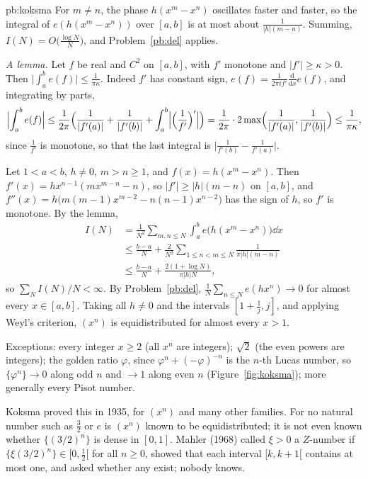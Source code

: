 \begin{solution}{pb:koksma}
\idea For $m\ne n$, the phase $h(x^m-x^n)$ oscillates faster and faster, so the integral of $e(h(x^m-x^n))$ over $[a,b]$ is at most about $\frac1{|h|(m-n)}$.
Summing, $I(N)=O\bigl(\frac{\log N}N\bigr)$, and Problem~\ref{pb:del} applies.

\writeup \emph{A lemma.} Let $f$ be real and $C^2$ on $[a,b]$, with $f'$ monotone and $|f'|\ge\kappa>0$. Then $\bigl|\int_a^be(f)\bigr|\le\frac1{\pi\kappa}$. Indeed $f'$ has
constant sign, $e(f)=\frac1{2\pi if'}\frac{\mathrm d}{\mathrm dx}e(f)$, and integrating by parts,
\[
\Bigl|\int_a^be(f)\Bigr|\le\frac1{2\pi}\Bigl(\frac1{|f'(a)|}+\frac1{|f'(b)|}+\int_a^b\Bigl|\Bigl(\frac1{f'}\Bigr)'\Bigr|\Bigr)=\frac1{2\pi}\cdot2\max\Bigl(\frac1{|f'(a)|},\frac1{|f'(b)|}\Bigr)\le\frac1{\pi\kappa},
\]
since $\frac1{f'}$ is monotone, so that the last integral is $\bigl|\frac1{f'(b)}-\frac1{f'(a)}\bigr|$.

Let $1<a<b$, $h\ne0$, $m>n\ge1$, and $f(x)=h(x^m-x^n)$. Then $f'(x)=hx^{n-1}(mx^{m-n}-n)$, so $|f'|\ge|h|(m-n)$ on $[a,b]$, and
$f''(x)=h\bigl(m(m-1)x^{m-2}-n(n-1)x^{n-2}\bigr)$ has the sign of $h$, so $f'$ is monotone. By the lemma,
\[
\begin{aligned}
I(N)&=\frac1{N^2}\sum_{m,n\le N}\int_a^be\bigl(h(x^m-x^n)\bigr)\dd x\\
&\le\frac{b-a}N+\frac2{N^2}\sum_{1\le n<m\le N}\frac1{\pi|h|(m-n)}\\
&\le\frac{b-a}N+\frac{2(1+\log N)}{\pi|h|N},
\end{aligned}
\]
so $\sum_NI(N)/N<\infty$. By Problem~\ref{pb:del}, $\frac1N\sum_{n\le N}e(hx^n)\to0$ for almost every $x\in[a,b]$. Taking all $h\ne0$ and the intervals $[1+\frac1j,j]$, and applying
Weyl's criterion, $(x^n)$ is equidistributed for almost every $x>1$.

Exceptions: every integer $x\ge2$ (all $x^n$ are integers); $\sqrt2$ (the even powers are integers); the golden ratio $\varphi$, since
$\varphi^n+(-\varphi)^{-n}$ is the $n$-th Lucas number, so $\{\varphi^n\}\to0$ along odd $n$ and $\to1$ along even $n$ (Figure~\ref{fig:koksma}); more generally every
Pisot number.

\leads Koksma proved this in 1935, for $(x^n)$ and many other families. For no natural number such as $\frac32$ or $e$ is $(x^n)$ known to be equidistributed;
it is not even known whether $\{(3/2)^n\}$ is dense in $[0,1]$. Mahler (1968) called $\xi>0$ a $Z$-number if $\{\xi(3/2)^n\}\in[0,\frac12[$ for all $n\ge0$, showed that each
interval $[k,k+1[$ contains at most one, and asked whether any exist; nobody knows.
\end{solution}

